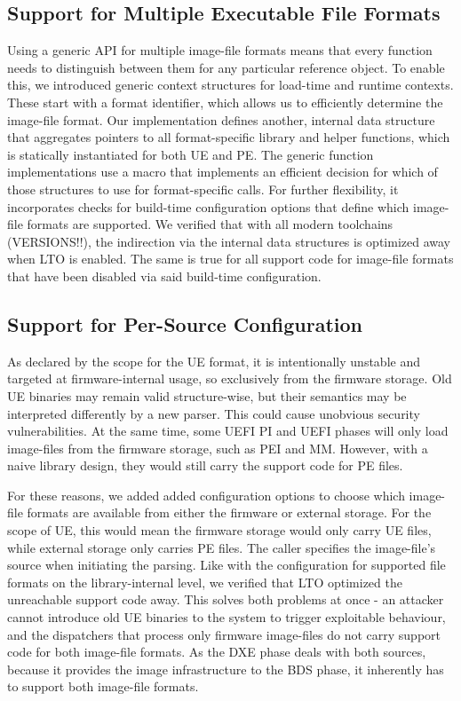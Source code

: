 \subsection{Support for Multiple Executable File Formats}

Using a generic API for multiple \gls{image-file} formats means that every function needs to distinguish between them for any particular reference object. To enable this, we introduced generic context structures for load-time and runtime contexts. These start with a format identifier, which allows us to efficiently determine the \gls{image-file} format. Our implementation defines another, internal data structure that aggregates pointers to all format-specific library and helper functions, which is statically instantiated for both UE and PE. The generic function implementations use a macro that implements an efficient decision for which of those structures to use for format-specific calls. For further flexibility, it incorporates checks for build-time configuration options that define which \gls{image-file} formats are supported. We verified that with all modern toolchains (VERSIONS!!), the indirection via the internal data structures is optimized away when LTO is enabled. The same is true for all support code for \gls{image-file} formats that have been disabled via said build-time configuration.

\subsection{Support for Per-Source Configuration}

As declared by the scope for the UE format, it is intentionally unstable and targeted at firmware-internal usage, so exclusively from the firmware storage. Old UE binaries may remain valid structure-wise, but their semantics may be interpreted differently by a new parser. This could cause unobvious security vulnerabilities. At the same time, some UEFI PI and UEFI phases will only load \glspl{image-file} from the firmware storage, such as PEI and MM. However, with a naive library design, they would still carry the support code for PE files.

For these reasons, we added added configuration options to choose which \gls{image-file} formats are available from either the firmware or external storage. For the scope of UE, this would mean the firmware storage would only carry UE files, while external storage only carries PE files. The caller specifies the \gls{image-file}'s source when initiating the parsing. Like with the configuration for supported file formats on the library-internal level, we verified that LTO optimized the unreachable support code away. This solves both problems at once - an attacker cannot introduce old UE binaries to the system to trigger exploitable behaviour, and the dispatchers that process only firmware \glspl{image-file} do not carry support code for both \gls{image-file} formats. As the DXE phase deals with both sources, because it provides the image infrastructure to the BDS phase, it inherently has to support both \gls{image-file} formats.

